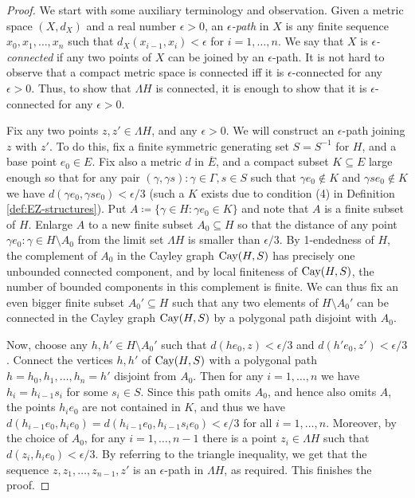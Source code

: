 \documentclass[12pt, a4paper]{article}
\newcommand{\8}{\infty}
\theoremstyle{break}
\theoremstyle{defbreak}
\newcommand{\ol}[1]{\overline{#1}}
\begin{document}
\begin{proof}
We start with some auxiliary terminology and observation.
Given a metric space $(X,d_X)$ and a real number $\epsilon>0$,
an {\it $\epsilon$-path} in $X$ is any finite sequence 
$x_0,x_1,\dots,x_n$ such that $d_X(x_{i-1},x_i)<\epsilon$
for $i=1,\dots,n$.
We say that $X$ is {\it $\epsilon$-connected} if any two points of $X$
can be joined by an $\epsilon$-path.
It is not hard to observe that a compact metric space is connected
iff it is $\epsilon$-connected for any $\epsilon>0$.
Thus, to show that $\Lambda H$ is connected, it is enough to show that
it is $\epsilon$-connected for any $\epsilon>0$.

Fix any two points $z,z'\in\Lambda H$, and any $\epsilon>0$.
We will construct an $\epsilon$-path joining $z$ with $z'$.
To do this, fix a finite symmetric generating set $S=S^{-1}$ for $H$,
and a base point $e_0\in E$. Fix also a metric $d$ in $\ol E$,
and a compact subset $K\subseteq E$ large enough so that for any pair
$(\gamma,\gamma s):\gamma\in\Gamma, s\in S$ 
such that $\gamma e_0\notin K$ and $\gamma se_0\notin K$ we have
$d(\gamma e_0, \gamma s e_0)<\epsilon/3$
(such a $K$ exists due to condition (4) in Definition 
\ref{def:EZ-structures}).
Put $A\coloneqq\{ \gamma\in H:\gamma e_0\in K \}$ and note that $A$
is a finite subset of $H$. Enlarge $A$ to a new finite subset $A_0\subseteq H$
so that the distance of any point $\gamma e_0:\gamma\in H\setminus A_0$
from the limit set $\Lambda H$ is smaller than $\epsilon/3$.
By 1-endedness of $H$, the complement of $A_0$ in the Cayley graph $\hbox{Cay}(H,S)$
has precisely one unbounded connected component, and by local finiteness of
$\hbox{Cay}(H,S)$, the number of bounded components in this complement is finite.
We can thus fix an even bigger finite
subset $A_0'\subseteq H$ such that any two elements of $H\setminus A_0'$
can be connected
in the Cayley graph $\hbox{Cay}(H,S)$ by a polygonal path disjoint with $A_0$.

Now, choose any $h,h'\in H\setminus A_0'$ such that $d(he_0,z)<\epsilon/3$
and $d(h'e_0,z')<\epsilon/3$. 
Connect the vertices $h,h'$ of $\hbox{Cay}(H,S)$ with a polygonal path
$h=h_0,h_1,\dots,h_n=h'$ disjoint from $A_0$. Then for any $i=1,\dots,n$
we have $h_i=h_{i-1}s_i$ for some $s_i\in S$. 
Since this path omits $A_0$, and hence also omits $A$, the points
$h_ie_0$ are not contained in $K$, and thus we have
$d(h_{i-1}e_0,h_ie_0)=d(h_{i-1}e_0,h_{i-1}s_ie_0)<\epsilon/3$
for all $i=1,\dots,n$. Moreover, by the choice of $A_0$,
for any $i=1,\dots,n-1$ there is a point $z_i\in\Lambda H$ such that
$d(z_i,h_ie_0)<\epsilon/3$.
By referring to the triangle inequality, we get that 
the sequence $z,z_1,\dots,z_{n-1},z'$ is an $\epsilon$-path in 
$\Lambda H$, as required. This finishes the proof.
\end{proof}
\end{document}
